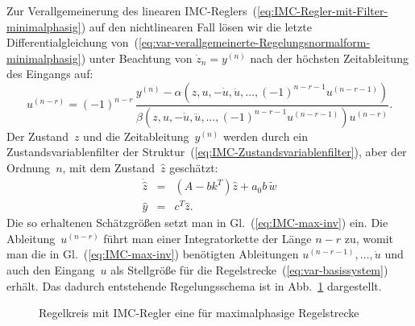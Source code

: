 Zur Verallgemeinerung des linearen IMC-Reglers~(\ref{eq:IMC-Regler-mit-Filter-minimalphasig})
auf den nichtlinearen Fall lösen wir die letzte Differentialgleichung
von~(\ref{eq:var-verallgemeinerte-Regelungsnormalform-minimalphasig})
unter Beachtung von $\dot{z}_{n}=y^{(n)}$ nach der höchsten Zeitableitung
des Eingangs auf:
\begin{equation}
u^{(n-r)}=\left(-1\right)^{n-r}\,\frac{y^{(n)}-\alpha\left(z,u,-\dot{u},\ddot{u},\ldots,(-1)^{n-r-1}u^{(n-r-1)}\right)}{\beta\left(z,u,-\dot{u},\ddot{u},\ldots,(-1)^{n-r-1}u^{(n-r-1)}\right)u^{(n-r)}}.\label{eq:IMC-max-inv}
\end{equation}
Der Zustand~$z$ und die Zeitableitung~$y^{(n)}$ werden durch ein
Zustandsvariablenfilter der Struktur~(\ref{eq:IMC-Zustandsvariablenfilter}),
aber der Ordnung~$n$, mit dem Zustand~$\hat{z}$ geschätzt:
\begin{equation}
\begin{array}{lcl}
\dot{\hat{z}} & = & \left(A-bk^{T}\right)\hat{z}+a_{0}b\,\tilde{w}\\
\hat{y} & = & c^{T}\hat{z}.
\end{array}\label{eq:Filter-maximalphasig}
\end{equation}
Die so erhaltenen Schätzgrößen setzt man in Gl.~(\ref{eq:IMC-max-inv})
ein. Die Ableitung~$u^{(n-r)}$ führt man einer Integratorkette der
Länge $n-r$ zu, womit man die in Gl.~(\ref{eq:IMC-max-inv}) benötigten
Ableitungen $u^{(n-r-1)},\ldots,\dot{u}$ und auch den Eingang~$u$
als Stellgröße für die Regelstrecke~(\ref{eq:var-basissystem}) erhält.
Das dadurch entstehende Regelungsschema ist in Abb.~\ref{fig:Regelkreis-IMC-maximalphasig}
dargestellt.

\begin{figure}
\begin{centering}
\resizebox{1\textwidth}{!}{}
\par\end{centering}
\caption{Regelkreis mit IMC-Regler eine für maximalphasige Regelstrecke\label{fig:Regelkreis-IMC-maximalphasig}}
\end{figure}


